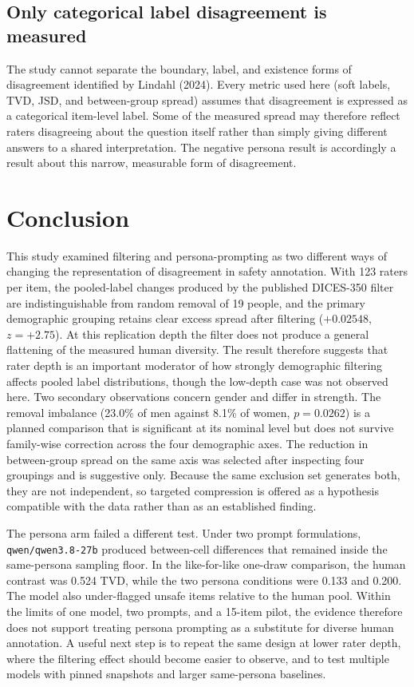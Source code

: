 \documentclass[11pt,a4paper]{article}
\begin{document}
\subsection{Only categorical label disagreement is measured}
The study cannot separate the boundary, label, and existence forms of disagreement identified by
Lindahl (2024). Every metric used here (soft labels, TVD, JSD, and between-group spread)
assumes that disagreement is expressed as a categorical item-level label. Some of the measured
spread may therefore reflect raters disagreeing about the question itself rather than simply
giving different answers to a shared interpretation. The negative persona result is accordingly a
result about this narrow, measurable form of disagreement.


\section{Conclusion}

This study examined filtering and persona-prompting as two different ways of changing the
representation of disagreement in safety annotation. With 123 raters per item, the pooled-label
changes produced by the published DICES-350 filter are indistinguishable from random removal of 19
people, and the primary demographic grouping retains clear excess spread after filtering
($+0.02548$, $z = +2.75$). At this replication depth the filter does not produce a general
flattening of the measured human diversity. The result therefore suggests that rater depth is an
important moderator of how strongly demographic filtering affects pooled label distributions,
though the low-depth case was not observed here. Two secondary observations concern gender and differ in strength. The removal
imbalance (23.0\% of men against 8.1\% of women, $p = 0.0262$) is a planned comparison that is
significant at its nominal level but does not survive family-wise correction across the four
demographic axes. The reduction in between-group spread on the same axis was selected after
inspecting four groupings and is suggestive only. Because the same exclusion set generates both,
they are not independent, so targeted compression is offered as a hypothesis compatible with the
data rather than as an established finding.

The persona arm failed a different test. Under two prompt formulations,
\texttt{qwen/qwen3.8-27b} produced between-cell differences that remained inside the same-persona
sampling floor. In the like-for-like one-draw comparison, the human contrast was 0.524 TVD, while
the two persona conditions were 0.133 and 0.200. The model also under-flagged unsafe items
relative to the human pool. Within the limits of one model, two prompts, and a 15-item pilot, the
evidence therefore does not support treating persona prompting as a substitute for diverse human
annotation. A useful next step is to repeat the same design at lower rater depth, where the
filtering effect should become easier to observe, and to test multiple models with pinned
snapshots and larger same-persona baselines.
\end{document}
